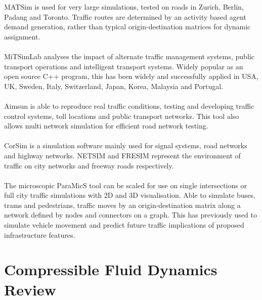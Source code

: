 	MATSim is used for very large simulations, tested on roads in Zurich, Berlin, Padang and Toronto. Traffic routes are determined by an activity based agent demand generation, rather than typical origin-destination matrices for dynamic assignment. 
	\\ \\
	MiTSimLab analyses the impact of alternate traffic management systems, public transport operations and intelligent transport systems. Widely popular as an open source C++ program, this has been widely and successfully applied in USA, UK, Sweden, Italy, Switzerland, Japan, Korea, Malaysia and Portugal.
	\\ \\
	Aimsun is able to reproduce real traffic conditions, testing and developing traffic control systems, toll locations and public transport networks. This tool also allows multi network simulation for efficient road network testing. 
	\\ \\
	CorSim is a simulation software mainly used for signal systems, road networks and highway networks. NETSIM and FRESIM represent the environment of traffic on city networks and freeway roads respectively.
	\\ \\
	The microscopic ParaMicS tool can be scaled for use on single intersections or full city traffic simulations with 2D and 3D visualisation. Able to simulate buses, trams and pedestrians, traffic moves by an origin-destination matrix along a network defined by nodes and connectors on a graph. This has previously used to simulate vehicle movement and predict future traffic implications of proposed infrastructure features. 
	
\newpage
\section{Compressible Fluid Dynamics Review}

